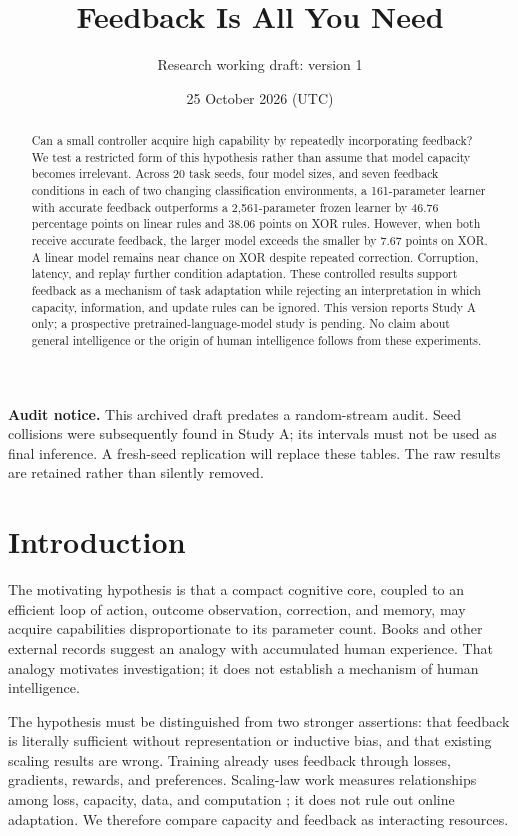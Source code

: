 \documentclass[11pt]{article}
\title{Feedback Is All You Need}
\author{Research working draft: version 1}
\date{25 October 2026 (UTC)}
\begin{document}
\maketitle
\noindent\textbf{Audit notice.} This archived draft predates a random-stream
audit. Seed collisions were subsequently found in Study A; its intervals must
not be used as final inference. A fresh-seed replication will replace these
tables. The raw results are retained rather than silently removed.
\begin{abstract}
Can a small controller acquire high capability by repeatedly incorporating
feedback? We test a restricted form of this hypothesis rather than assume
that model capacity becomes irrelevant. Across 20 task seeds, four model
sizes, and seven feedback conditions in each of two changing classification
environments, a 161-parameter learner with accurate feedback outperforms a
2,561-parameter frozen learner by 46.76 percentage points on linear rules and
38.06 points on XOR rules. However, when both receive accurate feedback, the
larger model exceeds the smaller by 7.67 points on XOR. A linear model remains
near chance on XOR despite repeated correction. Corruption, latency, and replay
further condition adaptation. These controlled results support feedback as a
mechanism of task adaptation while rejecting an interpretation in which
capacity, information, and update rules can be ignored. This version reports
Study A only; a prospective pretrained-language-model study is pending. No
claim about general intelligence or the origin of human intelligence follows
from these experiments.
\end{abstract}

\section{Introduction}
The motivating hypothesis is that a compact cognitive core, coupled to an
efficient loop of action, outcome observation, correction, and memory, may
acquire capabilities disproportionate to its parameter count. Books and other
external records suggest an analogy with accumulated human experience. That
analogy motivates investigation; it does not establish a mechanism of human
intelligence.

The hypothesis must be distinguished from two stronger assertions: that
feedback is literally sufficient without representation or inductive bias,
and that existing scaling results are wrong. Training already uses feedback
through losses, gradients, rewards, and preferences. Scaling-law work measures
relationships among loss, capacity, data, and computation \cite{kaplan,hoffmann};
it does not rule out online adaptation. We therefore compare capacity and
feedback as interacting resources.
\end{document}
